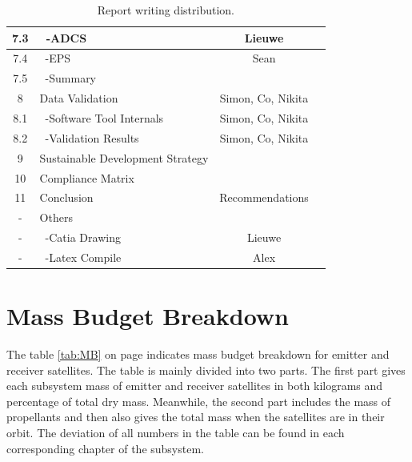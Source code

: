 \begin{table}[ht!]
{\begin{tabular}{|c|l|c|c|}
 7.3     & \ -ADCS                              & Lieuwe &\\\hline
 7.4     & \ -EPS                               & Sean &\\\hline
 7.5     & \ -Summary                           &\\\hline\hline
 8       & Data Validation                      & Simon, Co, Nikita &\\\hline
 8.1     & \ -Software Tool Internals           & Simon, Co, Nikita &\\\hline
 8.2     & \ -Validation Results                & Simon, Co, Nikita &\\\hline
 9       & Sustainable Development Strategy     &\\\hline
 10      & Compliance Matrix                    &\\\hline\hline
 11      & Conclusion & Recommendations         &\\\hline\hline
 -       & Others                               &\\\hline
 -       & \ -Catia Drawing                     & Lieuwe &\\\hline
 -       & \ -Latex Compile                     & Alex &\\\hline

\end{tabular}
}
\caption{Report writing distribution.}
\label{tab:RWD}
\end{table}

\section{Mass Budget Breakdown}
\label{DDMBB}
The table \ref{tab:MB} on page \pageref{tab:MB} indicates mass budget breakdown for emitter and receiver satellites. The table is mainly divided into two parts. The first part gives each subsystem mass of emitter and receiver satellites in both kilograms and percentage of total dry mass. Meanwhile, the second part includes the mass of propellants and then also gives the total mass when the satellites are in their orbit. The deviation of all numbers in the table can be found in each corresponding chapter of the subsystem.

